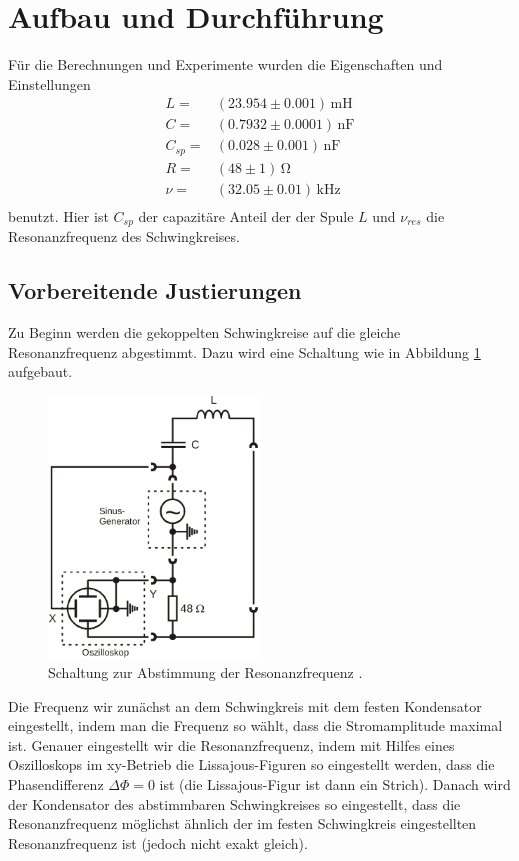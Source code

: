 \section{Aufbau und Durchführung}
\label{sec:Durchführung}
Für die Berechnungen und Experimente wurden die Eigenschaften und Einstellungen
\begin{align*}
  L=&(23.954\pm0.001)\,\si{\milli\henry}  \\
  C=&(0.7932\pm0.0001)\,\si{\nano\farad}  \\
  C_{sp}=&(0.028\pm0.001)\,\si{\nano\farad}\\
  R=&(48\pm1)\,\si{\ohm}\\
  \nu=&(32.05\pm0.01)\,\si{\kilo\hertz}\\
\end{align*}
benutzt. Hier ist $C_{sp}$ der capazitäre Anteil der der Spule $L$ und $\nu_{res}$ die
Resonanzfrequenz des Schwingkreises.
\subsection{Vorbereitende Justierungen}
Zu Beginn werden die gekoppelten Schwingkreise auf die gleiche Resonanzfrequenz
abgestimmt. Dazu wird eine Schaltung wie in Abbildung \ref{fig:abstimmung}
aufgebaut.
\begin{figure}
  \centering
  \includegraphics[width=0.5\textwidth]{abstimmung_neu.png}
  \caption{Schaltung zur Abstimmung der Resonanzfrequenz \cite{sample}.}
  \label{fig:abstimmung}
\end{figure}
Die Frequenz wir zunächst an dem Schwingkreis mit dem festen Kondensator eingestellt,
indem man die Frequenz so wählt, dass die Stromamplitude maximal ist. Genauer
eingestellt wir die Resonanzfrequenz, indem mit Hilfes eines Oszilloskops im
xy-Betrieb die Lissajous-Figuren so eingestellt werden, dass die Phasendifferenz
$\Delta \Phi = 0$ ist (die Lissajous-Figur ist dann ein Strich). Danach wird der
Kondensator des abstimmbaren Schwingkreises so eingestellt, dass die Resonanzfrequenz
möglichst ähnlich der im festen Schwingkreis eingestellten Resonanzfrequenz ist
(jedoch nicht exakt gleich).

